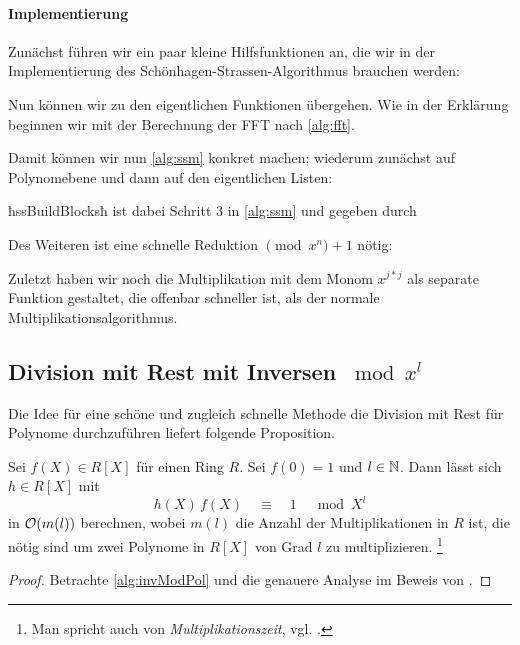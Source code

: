 \paragraph{Implementierung}
Zunächst führen wir ein paar kleine Hilfsfunktionen an, die wir in der
Implementierung des Schönhagen-Strassen-Algorithmus brauchen werden:

Nun können wir zu den eigentlichen Funktionen übergehen.
Wie in der Erklärung beginnen wir mit der Berechnung der FFT nach 
\autoref{alg:fft}.

Damit können wir nun \autoref{alg:ssm} konkret machen; wiederum zunächst auf
Polynomebene und dann auf den eigentlichen Listen:

ħssBuildBlocksħ ist dabei Schritt 3 in \autoref{alg:ssm} und gegeben durch

Des Weiteren ist eine schnelle Reduktion $\pmod x^n+1$ nötig:

Zuletzt haben wir noch die Multiplikation mit dem Monom $x^{j*j}$ als separate
Funktion gestaltet, die offenbar schneller ist, als der normale
Multiplikationsalgorithmus.

\subsection{Division mit Rest mit Inversen $\bmod x^l$}
Die Idee für eine schöne und zugleich schnelle Methode die 
Division mit Rest für Polynome durchzuführen liefert folgende Proposition.

\begin{prop}
  Sei $f(X) \in R[X]$ für einen Ring $R$. Sei $f(0) = 1$ und 
  $l \in \mathbb{N}$. Dann lässt sich $h \in R[X]$ mit
  \[ h(X)\, f(X) \quad\equiv\quad 1 \quad \bmod X^l\]
  in $\mathcal{O}(m(l))$ berechnen,
  wobei $m(l)$ die Anzahl der Multiplikationen in $R$ ist, die nötig sind 
  um zwei Polynome in $R[X]$ von Grad $l$ zu multiplizieren.%
  \footnote{Man spricht auch von \emph{Multiplikationszeit}, 
  vgl. \autocite[Definition 2]{divHensel}.}
\end{prop}
\begin{proof}
  Betrachte \autoref{alg:invModPol} und die genauere Analyse im Beweis von
  \autocite[Theorem 2]{divHensel}.
\end{proof}


